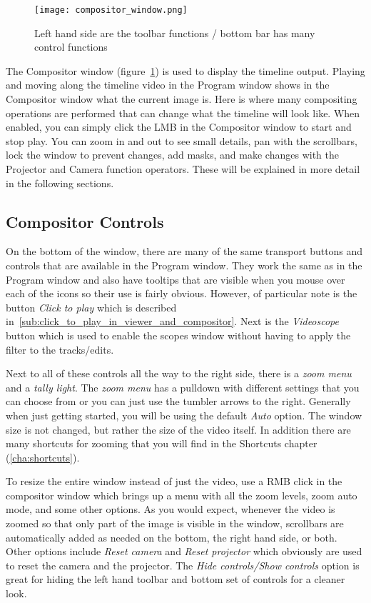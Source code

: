 \begin{figure}[htpb]
    \centering
    \texttt{[image: compositor\_window.png]}
    \caption{Left hand side are the toolbar functions / bottom bar has many control functions}
    \label{fig:compositor_window}
\end{figure}

The Compositor window (figure~\ref{fig:compositor_window}) is used to display the timeline
output.  Playing and moving along the timeline video in the Program window shows in the
Compositor window what the current image is.  Here is where many compositing operations are
performed that can change 
what the timeline will look like.  When enabled, you can simply click the LMB in the Compositor
window to start and stop play.
  You can zoom in and out to 
see small details, pan with the scrollbars, lock the window to prevent changes, add masks,
and make changes with the Projector and Camera function operators. These will be explained
in more detail in the following sections.

\subsection{Compositor Controls}%
\label{sub:compositor_controls}

On the bottom of the window, there are many
of the same transport buttons and controls that are available in the Program window.
They work the same as in the Program window and also have tooltips that are visible 
when you mouse over each of the icons so their use is fairly obvious.  However,
of particular note is the button \textit{Click to play} which is described in~\ref{sub:click_to_play_in_viewer_and_compositor}.  Next is the \textit{Videoscope} button which is used to enable the scopes window
without having to apply the filter to the tracks/edits.

Next to all of these controls all the way to the right side, there is a \textit{zoom menu} and a \textit{tally light}.  The \textit{zoom menu} has a pulldown with different settings that you can choose from
or you can just use the tumbler arrows to the right. Generally when just getting started, you
will be using the default \textit{Auto} option.  The window size is not changed, but rather
the size of the video itself. In addition there are many shortcuts for zooming that you
will find in the Shortcuts chapter (\ref{cha:shortcuts}).

To resize the entire window instead of just the video, use a RMB click in the compositor
window which brings up a menu with all the zoom levels, zoom auto mode, and some other options. 
As you would expect, whenever the video is zoomed so that only part of the image is visible
in the window, scrollbars are automatically added as needed on the bottom, the right hand 
side, or both.
Other options include \emph{Reset camera} and \emph{Reset projector} which obviously are used
to reset the camera and the projector. 
The \emph{Hide controls/Show controls} option is great for hiding the left hand toolbar and
bottom set of controls for a cleaner look. 

